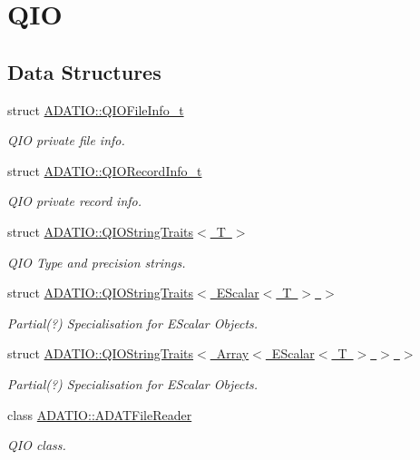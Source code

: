 \hypertarget{group__qio}{}\section{Q\+IO}
\label{group__qio}
\subsection*{Data Structures}
\begin{DoxyCompactItemize}
\item 
struct \mbox{\hyperlink{structADATIO_1_1QIOFileInfo__t}{A\+D\+A\+T\+I\+O\+::\+Q\+I\+O\+File\+Info\+\_\+t}}
\begin{DoxyCompactList}\small\item\em Q\+IO private file info. \end{DoxyCompactList}\item 
struct \mbox{\hyperlink{structADATIO_1_1QIORecordInfo__t}{A\+D\+A\+T\+I\+O\+::\+Q\+I\+O\+Record\+Info\+\_\+t}}
\begin{DoxyCompactList}\small\item\em Q\+IO private record info. \end{DoxyCompactList}\item 
struct \mbox{\hyperlink{structADATIO_1_1QIOStringTraits}{A\+D\+A\+T\+I\+O\+::\+Q\+I\+O\+String\+Traits$<$ T $>$}}
\begin{DoxyCompactList}\small\item\em Q\+IO Type and precision strings. \end{DoxyCompactList}\item 
struct \mbox{\hyperlink{structADATIO_1_1QIOStringTraits_3_01EScalar_3_01T_01_4_01_4}{A\+D\+A\+T\+I\+O\+::\+Q\+I\+O\+String\+Traits$<$ E\+Scalar$<$ T $>$ $>$}}
\begin{DoxyCompactList}\small\item\em Partial(?) Specialisation for E\+Scalar Objects. \end{DoxyCompactList}\item 
struct \mbox{\hyperlink{structADATIO_1_1QIOStringTraits_3_01Array_3_01EScalar_3_01T_01_4_01_4_01_4}{A\+D\+A\+T\+I\+O\+::\+Q\+I\+O\+String\+Traits$<$ Array$<$ E\+Scalar$<$ T $>$ $>$ $>$}}
\begin{DoxyCompactList}\small\item\em Partial(?) Specialisation for E\+Scalar Objects. \end{DoxyCompactList}\item 
class \mbox{\hyperlink{classADATIO_1_1ADATFileReader}{A\+D\+A\+T\+I\+O\+::\+A\+D\+A\+T\+File\+Reader}}
\begin{DoxyCompactList}\small\item\em Q\+IO class. \end{DoxyCompactList}\end{DoxyCompactItemize}
